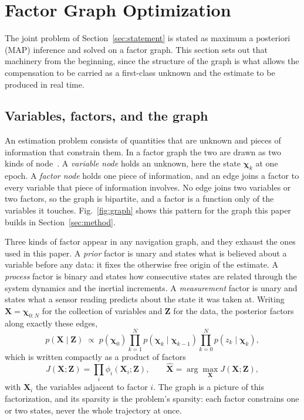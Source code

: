 \documentclass{IEEEtaes}
\begin{document}
\section{Factor Graph Optimization}\label{sec:fgo}
The joint problem of Section~\ref{sec:statement} is stated as maximum a posteriori (MAP) inference and
solved on a factor graph. This section sets out that machinery from the
beginning, since the structure of the graph is what allows the compensation to
be carried as a first-class unknown and the estimate to be produced in real
time.

\subsection{Variables, factors, and the graph}
An estimation problem consists of quantities that are unknown and pieces of
information that constrain them. In a factor graph the two are drawn as two
kinds of node~\cite{loeliger2004,dellaert2017}. A \emph{variable node} holds an
unknown, here the state $\boldsymbol{\chi}_k$ at one epoch. A \emph{factor node}
holds one piece of information, and an edge joins a factor to every variable
that piece of information involves. No edge joins two variables or two factors,
so the graph is bipartite, and a factor is a function only of the variables it
touches. Fig.~\ref{fig:graph} shows this pattern for the graph this paper
builds in Section~\ref{sec:method}.

Three kinds of factor appear in any navigation graph, and they exhaust the ones
used in this paper. A \emph{prior} factor is unary and states what is believed
about a variable before any data: it fixes the otherwise free origin of the
estimate. A \emph{process} factor is binary and states how consecutive states are
related through the system dynamics and the inertial increments. A
\emph{measurement} factor is unary and states what a sensor reading predicts
about the state it was taken at. Writing $\mathbf{X}=\boldsymbol{\chi}_{0:N}$
for the collection of variables and $\mathbf{Z}$ for the data, the posterior
factors along exactly these edges,
\begin{equation}
p(\mathbf{X}\mid\mathbf{Z})\;\propto\;
p(\boldsymbol{\chi}_0)
\prod_{k=1}^{N}p(\boldsymbol{\chi}_k\mid\boldsymbol{\chi}_{k-1})
\prod_{k=0}^{N}p(z_k\mid\boldsymbol{\chi}_k),
\label{eq:posterior}
\end{equation}
which is written compactly as a product of factors
\begin{equation}
J(\mathbf{X};\mathbf{Z})=\prod_i\phi_i(\mathbf{X}_i;\mathbf{Z}),
\qquad
\hat{\mathbf{X}}=\arg\max_{\mathbf{X}}J(\mathbf{X};\mathbf{Z}),
\label{eq:prodfactors}
\end{equation}
with $\mathbf{X}_i$ the variables adjacent to factor $i$. The graph is a
picture of this factorization, and its sparsity is the problem's sparsity: each
factor constrains one or two states, never the whole trajectory at once.
\end{document}
